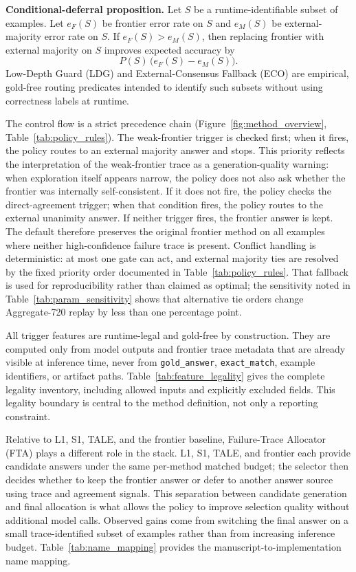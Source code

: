 \medskip\noindent\textbf{Conditional-deferral proposition.}
Let $S$ be a runtime-identifiable subset of examples. Let $e_F(S)$ be frontier error rate on $S$ and $e_M(S)$ be external-majority error rate on $S$. If $e_F(S) > e_M(S)$, then replacing frontier with external majority on $S$ improves expected accuracy by
\[
P(S)\,\big(e_F(S)-e_M(S)\big).
\]
Low-Depth Guard (LDG) and External-Consensus Fallback (ECO) are empirical,
gold-free routing predicates intended to identify such subsets without using
correctness labels at runtime.

The control flow is a strict precedence chain (Figure~\ref{fig:method_overview},
Table~\ref{tab:policy_rules}).
The weak-frontier trigger is checked first; when it fires, the policy routes to an
external majority answer and stops.
This priority reflects the interpretation of the weak-frontier trace as a
generation-quality warning: when exploration itself appears narrow, the policy
does not also ask whether the frontier was internally self-consistent.
If it does not fire, the policy checks the direct-agreement trigger; when that
condition fires, the policy routes to the external unanimity answer.
If neither trigger fires, the frontier answer is kept.
The default therefore preserves the original frontier method on all examples
where neither high-confidence failure trace is present.
Conflict handling is deterministic: at most one gate can act, and external
majority ties are resolved by the fixed priority order documented in
Table~\ref{tab:policy_rules}.
That fallback is used for reproducibility rather than claimed as optimal;
the sensitivity noted in Table~\ref{tab:param_sensitivity} shows that alternative
tie orders change Aggregate-720 replay by less than one percentage point.

All trigger features are runtime-legal and gold-free by construction.
They are computed only from model outputs and frontier trace metadata that are
already visible at inference time, never from \texttt{gold\_answer},
\texttt{exact\_match}, example identifiers, or artifact paths.
Table~\ref{tab:feature_legality} gives the complete legality inventory, including
allowed inputs and explicitly excluded fields.
This legality boundary is central to the method definition, not only a reporting
constraint.

Relative to L1, S1, TALE, and the frontier baseline, Failure-Trace Allocator (FTA) plays a different
role in the stack.
L1, S1, TALE, and frontier each provide candidate answers under the same
per-method matched budget; the selector then decides whether to keep the
frontier answer or defer to another answer source using trace and agreement signals.
This separation between candidate generation and final allocation is what allows the
policy to improve selection quality without additional model calls.
Observed gains come from switching the final answer on a small trace-identified
subset of examples rather than from increasing inference budget.
Table~\ref{tab:name_mapping} provides the manuscript-to-implementation name mapping.

